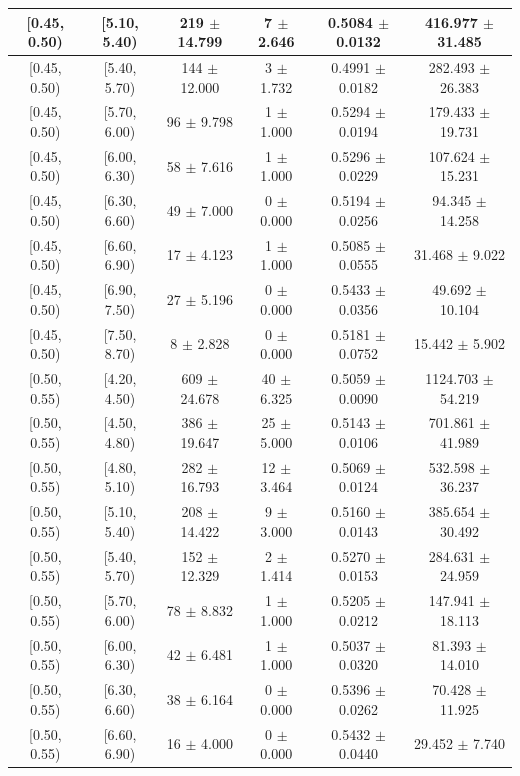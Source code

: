 \begin{longtable}{|c|c|c|c|c|c|}
\hline
[0.45, 0.50) & [5.10, 5.40) & 219 $\pm$ 14.799 & 7 $\pm$ 2.646 & 0.5084 $\pm$ 0.0132 & 416.977 $\pm$ 31.485 \\ 
\hline
[0.45, 0.50) & [5.40, 5.70) & 144 $\pm$ 12.000 & 3 $\pm$ 1.732 & 0.4991 $\pm$ 0.0182 & 282.493 $\pm$ 26.383 \\ 
\hline
[0.45, 0.50) & [5.70, 6.00) & 96 $\pm$ 9.798 & 1 $\pm$ 1.000 & 0.5294 $\pm$ 0.0194 & 179.433 $\pm$ 19.731 \\ 
\hline
[0.45, 0.50) & [6.00, 6.30) & 58 $\pm$ 7.616 & 1 $\pm$ 1.000 & 0.5296 $\pm$ 0.0229 & 107.624 $\pm$ 15.231 \\ 
\hline
[0.45, 0.50) & [6.30, 6.60) & 49 $\pm$ 7.000 & 0 $\pm$ 0.000 & 0.5194 $\pm$ 0.0256 & 94.345 $\pm$ 14.258 \\ 
\hline
[0.45, 0.50) & [6.60, 6.90) & 17 $\pm$ 4.123 & 1 $\pm$ 1.000 & 0.5085 $\pm$ 0.0555 & 31.468 $\pm$ 9.022 \\ 
\hline
[0.45, 0.50) & [6.90, 7.50) & 27 $\pm$ 5.196 & 0 $\pm$ 0.000 & 0.5433 $\pm$ 0.0356 & 49.692 $\pm$ 10.104 \\ 
\hline
[0.45, 0.50) & [7.50, 8.70) & 8 $\pm$ 2.828 & 0 $\pm$ 0.000 & 0.5181 $\pm$ 0.0752 & 15.442 $\pm$ 5.902 \\ 
\hline
[0.50, 0.55) & [4.20, 4.50) & 609 $\pm$ 24.678 & 40 $\pm$ 6.325 & 0.5059 $\pm$ 0.0090 & 1124.703 $\pm$ 54.219 \\ 
\hline
[0.50, 0.55) & [4.50, 4.80) & 386 $\pm$ 19.647 & 25 $\pm$ 5.000 & 0.5143 $\pm$ 0.0106 & 701.861 $\pm$ 41.989 \\ 
\hline
[0.50, 0.55) & [4.80, 5.10) & 282 $\pm$ 16.793 & 12 $\pm$ 3.464 & 0.5069 $\pm$ 0.0124 & 532.598 $\pm$ 36.237 \\ 
\hline
[0.50, 0.55) & [5.10, 5.40) & 208 $\pm$ 14.422 & 9 $\pm$ 3.000 & 0.5160 $\pm$ 0.0143 & 385.654 $\pm$ 30.492 \\ 
\hline
[0.50, 0.55) & [5.40, 5.70) & 152 $\pm$ 12.329 & 2 $\pm$ 1.414 & 0.5270 $\pm$ 0.0153 & 284.631 $\pm$ 24.959 \\ 
\hline
[0.50, 0.55) & [5.70, 6.00) & 78 $\pm$ 8.832 & 1 $\pm$ 1.000 & 0.5205 $\pm$ 0.0212 & 147.941 $\pm$ 18.113 \\ 
\hline
[0.50, 0.55) & [6.00, 6.30) & 42 $\pm$ 6.481 & 1 $\pm$ 1.000 & 0.5037 $\pm$ 0.0320 & 81.393 $\pm$ 14.010 \\ 
\hline
[0.50, 0.55) & [6.30, 6.60) & 38 $\pm$ 6.164 & 0 $\pm$ 0.000 & 0.5396 $\pm$ 0.0262 & 70.428 $\pm$ 11.925 \\ 
\hline
[0.50, 0.55) & [6.60, 6.90) & 16 $\pm$ 4.000 & 0 $\pm$ 0.000 & 0.5432 $\pm$ 0.0440 & 29.452 $\pm$ 7.740 \\ 

\end{longtable}
